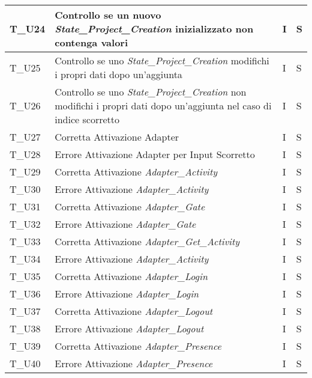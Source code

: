 \begin{center}
\begin{tabular}{ |m{3em}|m{23em}|m{3em}|m{3em}| }
      T\_U24 & Controllo se un nuovo \textit{State\_Project\_Creation} inizializzato non contenga valori & I & S \\
      \hline
      T\_U25 & Controllo se uno \textit{State\_Project\_Creation} modifichi i propri dati dopo un'aggiunta & I & S \\
      \hline
      T\_U26 & Controllo se uno \textit{State\_Project\_Creation} non modifichi i propri dati dopo un'aggiunta nel caso di indice scorretto & I & S \\
      \hline
      T\_U27 & Corretta Attivazione Adapter & I & S   \\
      \hline
      T\_U28 & Errore Attivazione Adapter per Input Scorretto & I & S  \\
      \hline
      T\_U29 & Corretta Attivazione \textit{Adapter\_Activity} & I & S    \\
      \hline
      T\_U30 & Errore Attivazione \textit{Adapter\_Activity} & I & S   \\
      \hline
      T\_U31 & Corretta Attivazione \textit{Adapter\_Gate} & I & S  \\
      \hline
      T\_U32 & Errore Attivazione \textit{Adapter\_Gate} & I & S   \\
      \hline
      T\_U33 & Corretta Attivazione \textit{Adapter\_Get\_Activity} & I & S   \\
      \hline
      T\_U34 & Errore Attivazione \textit{Adapter\_Activity} & I & S   \\
      \hline
      T\_U35 & Corretta Attivazione \textit{Adapter\_Login} & I & S  \\
      \hline
      T\_U36 & Errore Attivazione \textit{Adapter\_Login} & I & S   \\
      \hline
      T\_U37 & Corretta Attivazione \textit{Adapter\_Logout} & I & S  \\
      \hline
      T\_U38 & Errore Attivazione \textit{Adapter\_Logout} & I & S  \\
      \hline
      T\_U39 & Corretta Attivazione \textit{Adapter\_Presence} & I & S   \\
      \hline
      T\_U40 & Errore Attivazione \textit{Adapter\_Presence} & I & S \\
      \hline
    \end{tabular}
    \newpage
    \begin{tabular}{ |m{3em}|m{23em}|m{3em}|m{3em}| }

\end{tabular}
\end{center}
